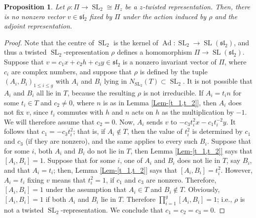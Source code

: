 \documentclass[11pt,oneside,dvipsnames]{amsart}
\theoremstyle{plain}
\newtheorem{Prop}[Thm]{Proposition}
\theoremstyle{definition}
\theoremstyle{named}
\DeclareMathOperator{\Ad}{Ad}
\DeclareMathOperator{\SL}{SL}
\begin{document}
\begin{Prop}\label{Prop-Hz-non-fix-sl2}
Let $\rho:\Pi\rightarrow\SL_2\cong H_z$ be a $z$-twisted representation. Then, there is no nonzero vector $v\in\mathfrak{sl}_2$ fixed by $\Pi$ under the action induced by $\rho$ and the adjoint representation.
\end{Prop}
\begin{proof}
Note that the centre of $\SL_2$ is the kernel of $\Ad:\SL_2\rightarrow\SL(\mathfrak{sl}_2)$, and thus a twisted $\SL_2$-representation $\rho$ defines a homomorphism $\Pi\rightarrow\SL(\mathfrak{sl}_2)$. Suppose that $v=c_1x+c_2h+c_3y\in\mathfrak{sl}_2$ is a nonzero invariant vector of $\Pi$, where $c_i$ are complex numbers, and suppose that $\rho$ is defined by the tuple $(A_i,B_i)_{1\le i\le g}$ with $A_i$ and $B_i$ lying in $N_{\SL_2}(T)\subset\SL_2$. It is not possible that $A_i$ and $B_i$ all lie in $T$, because the resulting $\rho$ is not irreducible. If $A_i=t_in$ for some $t_i\in T$ and $c_2\ne0$, where $n$ is as in Lemma \ref{Lem-[t_1,t_2]}, then $A_i$ does not fix $v$, since $t_i$ commutes with $h$ and $n$ acts on $h$ as the multiplication by $-1$. We will therefore assume that $c_2=0$. Now, $A_i$ sends $v$ to $-c_3t_i^2x-c_1t_i^{-2}y$. It follows that $c_1=-c_3t_i^2$; that is, if $A_i\notin T$, then the value of $t_i^2$ is determined by $c_1$ and $c_3$ (if they are nonzero), and the same applies to every such $B_i$. Suppose that for some $i$, both $A_i$ and $B_i$ do not lie in $T$, then Lemma \ref{Lem-[t_1,t_2]} says that $[A_i,B_i]=1$. Suppose that for some $i$, one of $A_i$ and $B_i$ does not lie in $T$, say $B_i$, and that $A_i=t_i$; then, Lemma \ref{Lem-[t_1,t_2]} says that $[A_i,B_i]=t_i^2$. However, $A_i=t_i$ fixing $v$ means that $t_i^2=1$, if $c_1$ and $c_3$ are nonzero. Therefore, $[A_i,B_i]=1$ under the assumption that $A_i\in T$ and $B_i\notin T$. Obviously, $[A_i,B_i]=1$ if both $A_i$ and $B_i$ lie in $T$. Therefore $\prod_{i=1}^g[A_i,B_i]=1$; i.e., $\rho$ is not a twisted $\SL_2$-representation. We conclude that $c_1=c_2=c_3=0$.
\end{proof}
\end{document}
